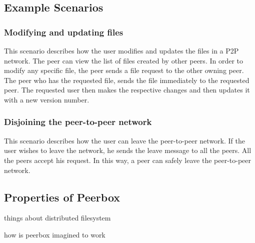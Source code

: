 
\subsection{Example Scenarios}


\subsubsection{Modifying and updating files}
This scenario describes how the user modifies and updates the files in a P2P network. The peer can view the list of files created by other peers. In order to modify any specific file, the peer sends a file request to the other owning peer. The peer who has the requested file, sends the file immediately to the requested peer. The requested user then makes the respective changes and then updates it with a new version number.  

\subsubsection{Disjoining the peer-to-peer network}
This scenario describes how the user can leave the peer-to-peer network. If the user wishes to leave the network, he sends the leave message to all the peers. All the peers accept his request. In this way, a peer can safely leave the peer-to-peer network.

\subsection{Properties of Peerbox}

things about distributed filesystem
 
how is peerbox imagined to work           
           
          